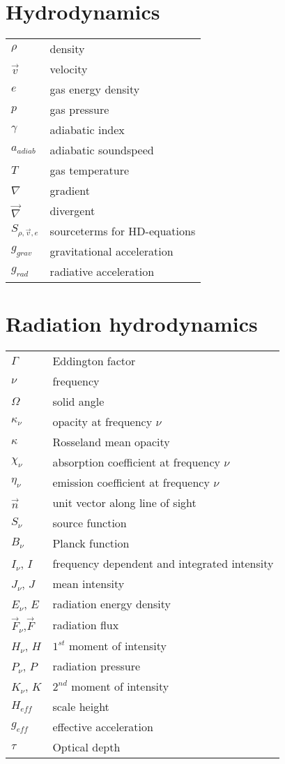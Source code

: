 \begin{multicols}{2}
\section*{Hydrodynamics}
\begin{tabular}{ll}
$\rho$         & density       \\
$\vec{v}$      & velocity      \\
$e$		  	   & gas energy density   \\
$p$		  	   & gas pressure  \\
$\gamma$       & adiabatic index \\
$a_{adiab}$    & adiabatic soundspeed \\
$T$		  	   & gas temperature \\
$\nabla$       & gradient\\
$\vec{\nabla}$ & divergent\\
$S_{\rho, \vec{v}, e}$ & sourceterms for HD-equations\\
$g_{grav}$     & gravitational acceleration \\
$g_{rad}$	   & radiative acceleration \\
\end{tabular}


\section*{Radiation hydrodynamics}
\begin{tabular}{ll}
$\Gamma$      & Eddington factor \\
$\nu$         & frequency \\
$\Omega$      & solid angle \\
$\kappa_\nu$  & opacity at frequency $\nu$ \\
$\kappa$      & Rosseland mean opacity\\
$\chi_\nu$    & absorption coefficient at frequency $\nu$ \\
$\eta_\nu$    & emission coefficient at frequency $\nu$ \\
$\vec{n}$     & unit vector along line of sight\\
$S_\nu$       & source function\\
$B_\nu$       & Planck function\\
$I_\nu$, $I$  & frequency dependent and integrated intensity\\
$J_\nu$, $J$  & mean intensity\\
$E_\nu$, $E$  & radiation energy density\\
$\vec{F}_\nu$,$\vec{F}$ & radiation flux\\
$H_\nu$, $H$  & $1^{st}$ moment of intensity\\
$P_\nu$, $P$  & radiation pressure\\
$K_\nu$, $K$  & $2^{nd}$ moment of intensity \\
$H_{eff}$     & scale height \\
$g_{eff}$ 	  & effective acceleration \\
$\tau$        & Optical depth \\
\end{tabular}


\end{multicols}
